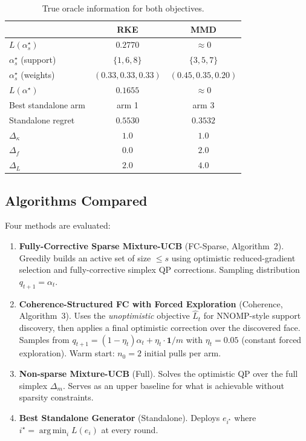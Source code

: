 \documentclass[11pt]{article}
\newcommand{\1}{\mathbf{1}}
\newcommand{\argmin}{\operatorname*{arg\,min}}
\begin{document}
\begin{table}[H]
\centering
\begin{tabular}{l|c|c}
\toprule
 & RKE & MMD \\
\midrule
$L(\alpha_s^\star)$ & $0.2770$ & $\approx 0$ \\
$\alpha_s^\star$ (support) & $\{1,6,8\}$ & $\{3,5,7\}$ \\
$\alpha_s^\star$ (weights) & $(0.33,0.33,0.33)$ & $(0.45,0.35,0.20)$ \\
$L(\alpha^\star)$ & $0.1655$ & $\approx 0$ \\
Best standalone arm & arm 1 & arm 3 \\
Standalone regret & $0.5530$ & $0.3532$ \\
\midrule
$\Delta_\kappa$ & $1.0$ & $1.0$ \\
$\Delta_f$ & $0.0$ & $2.0$ \\
$\Delta_L$ & $2.0$ & $4.0$ \\
\bottomrule
\end{tabular}
\caption{True oracle information for both objectives.}
\label{tab:oracles}
\end{table}

\subsection{Algorithms Compared}

Four methods are evaluated:

\begin{enumerate}[label=\textbf{A\arabic*}, leftmargin=*]
    \item \textbf{Fully-Corrective Sparse Mixture-UCB} (FC-Sparse, Algorithm~2). Greedily builds an active set of size $\le s$ using optimistic reduced-gradient selection and fully-corrective simplex QP corrections. Sampling distribution $q_{t+1} = \alpha_t$.
    \item \textbf{Coherence-Structured FC with Forced Exploration} (Coherence, Algorithm~3). Uses the \emph{unoptimistic} objective $\widehat L_t$ for NNOMP-style support discovery, then applies a final optimistic correction over the discovered face. Samples from $q_{t+1} = (1-\eta_t)\alpha_t + \eta_t \cdot \1/m$ with $\eta_t=0.05$ (constant forced exploration). Warm start: $n_0=2$ initial pulls per arm.
    \item \textbf{Non-sparse Mixture-UCB} (Full). Solves the optimistic QP over the full simplex $\Delta_m$. Serves as an upper baseline for what is achievable without sparsity constraints.
    \item \textbf{Best Standalone Generator} (Standalone). Deploys $e_{i^\star}$ where $i^\star = \argmin_i L(e_i)$ at every round.
\end{enumerate}
\end{document}

